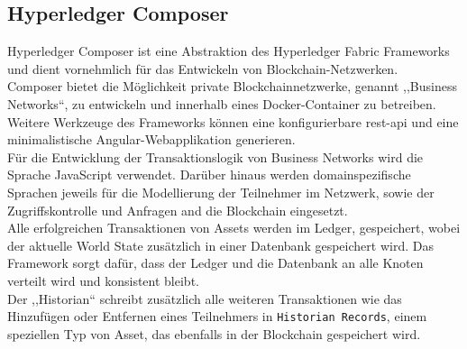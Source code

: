 \subsection{Hyperledger Composer}
\label{sec:prototype_composer}
        Hyperledger Composer\cite{ComposerDocs} ist eine Abstraktion des Hyperledger Fabric Frameworks und dient vornehmlich für das Entwickeln von Blockchain-Netzwerken. 
        \medskip\\
        Composer bietet die Möglichkeit private Blockchainnetzwerke, genannt ,,Business Networks``, zu entwickeln und innerhalb eines Docker-Container zu betreiben.
        Weitere Werkzeuge des Frameworks können eine konfigurierbare \gls{rest}-\gls{api} und eine minimalistische Angular-Webapplikation generieren.
        \medskip\\
        Für die Entwicklung der Transaktionslogik von Business Networks wird die Sprache JavaScript verwendet. 
        Darüber hinaus werden domainspezifische Sprachen jeweils für die Modellierung der Teilnehmer im Netzwerk, sowie der Zugriffskontrolle und Anfragen and die Blockchain eingesetzt.
        \medskip\\
        Alle erfolgreichen Transaktionen von Assets werden im Ledger, gespeichert, wobei der aktuelle World State zusätzlich in einer Datenbank gespeichert wird. 
        Das Framework sorgt dafür, dass der Ledger und die Datenbank an alle Knoten verteilt wird und konsistent bleibt.\\
        Der ,,Historian`` schreibt zusätzlich alle weiteren Transaktionen wie das Hinzufügen oder Entfernen eines Teilnehmers in \colorbox{light-gray}{\lstinline{Historian Records}}, einem speziellen Typ von Asset, das ebenfalls in der Blockchain gespeichert wird.
        
